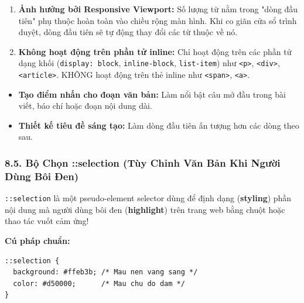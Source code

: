 \documentclass[11pt,oneside]{book}
\newcommand{\codeinline}[1]{\textcolor{accentOrange}{\texttt{#1}}}
\newcommand{\term}[1]{\textbf{\textcolor{primaryBlue}{#1}}}
\begin{document}
\begin{tipBox}
\begin{enumerate}[leftmargin=1.5em, itemsep=3pt, parsep=0pt]
    \item \textbf{Ảnh hưởng bởi Responsive Viewport:} Số lượng từ nằm trong "dòng đầu tiên" phụ thuộc hoàn toàn vào chiều rộng màn hình. Khi co giãn cửa sổ trình duyệt, dòng đầu tiên sẽ tự động thay đổi các từ thuộc về nó.
    \item \textbf{Không hoạt động trên phần tử inline:} Chỉ hoạt động trên các phần tử dạng khối (\codeinline{display: block}, \codeinline{inline-block}, \codeinline{list-item}) như \codeinline{<p>}, \codeinline{<div>}, \codeinline{<article>}. KHÔNG hoạt động trên thẻ inline như \codeinline{<span>}, \codeinline{<a>}.
\end{enumerate}
\end{tipBox}

\begin{conceptBox}
\begin{itemize}[leftmargin=1.5em, itemsep=3pt, parsep=0pt]
    \item \textbf{Tạo điểm nhấn cho đoạn văn bản:} Làm nổi bật câu mở đầu trong bài viết, báo chí hoặc đoạn nội dung dài.
    \item \textbf{Thiết kế tiêu đề sáng tạo:} Làm dòng đầu tiên ấn tượng hơn các dòng theo sau.
\end{itemize}
\end{conceptBox}

\subsubsection{8.5. Bộ Chọn ::selection (Tùy Chỉnh Văn Bản Khi Người Dùng Bôi Đen)}

\begin{conceptBox}
\codeinline{::selection} là một pseudo-element selector dùng để định dạng (\term{styling}) phần nội dung mà người dùng bôi đen (\term{highlight}) trên trang web bằng chuột hoặc thao tác vuốt cảm ứng!
\par\vspace{4pt}
\textbf{Cú pháp chuẩn:}
\begin{codeWindow}
\begin{lstlisting}[language=CSS3]
::selection {
  background: #ffeb3b; /* Mau nen vang sang */
  color: #d50000;      /* Mau chu do dam */
}
\end{lstlisting}
\end{codeWindow}
\end{conceptBox}
\end{document}

